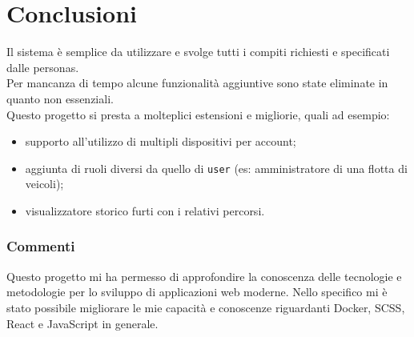 \documentclass{report}
\begin{document}
\section{Conclusioni}
Il sistema è semplice da utilizzare e svolge tutti i compiti richiesti e specificati dalle personas.\\ Per mancanza di tempo alcune funzionalità aggiuntive sono state eliminate in quanto non essenziali.\\Questo progetto si presta a molteplici estensioni e migliorie, quali ad esempio:
\begin{itemize}
    \item supporto all'utilizzo di multipli dispositivi per account;
    \item aggiunta di ruoli diversi da quello di \texttt{user} (es: amministratore di una flotta di veicoli);
    \item visualizzatore storico furti con i relativi percorsi.
\end{itemize}
\subsubsection{Commenti}
Questo progetto mi ha permesso di approfondire la conoscenza delle tecnologie e metodologie per lo sviluppo di applicazioni web moderne. Nello specifico mi è stato possibile migliorare le mie capacità e conoscenze riguardanti Docker, SCSS, React e JavaScript in generale.



\end{document}
